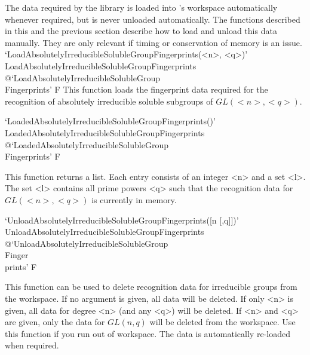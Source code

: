 
The data required by the {\IRREDSOL} library is loaded into {\GAP}'s workspace automatically whenever required, but is never unloaded automatically. The functions described in this
and the previous section describe how to load and unload this data manually. 
They are only relevant if timing or conservation of memory is an issue.
\>`LoadAbsolutelyIrreducibleSolubleGroupFingerprints(<n>, <q>)'%
{LoadAbsolutelyIrreducibleSolubleGroupFingerprints}%
@{`LoadAbsolutelyIrreducibleSolubleGroup\\Fingerprints'} F
This function loads the fingerprint data required for the recognition
of absolutely irreducible soluble subgroups of $GL(<n>, <q>)$.

\>`LoadedAbsolutelyIrreducibleSolubleGroupFingerprints()'%
{LoadedAbsolutelyIrreducibleSolubleGroupFingerprints}%
@{`LoadedAbsolutelyIrreducibleSolubleGroup\\Fingerprints'} F

This function returns a list. Each entry consists of an integer <n> and a set <l>. The set
<l> contains all prime powers <q> such that the recognition data for $GL(<n>, <q>)$ is currently in
memory.

\>`UnloadAbsolutelyIrreducibleSolubleGroupFingerprints([n [,q]])'%
{UnloadAbsolutelyIrreducibleSolubleGroupFingerprints}%
@{`UnloadAbsolutelyIrreducibleSolubleGroup\\Finger\\prints'} F

This function can be used to delete recognition data for irreducible groups from the {\GAP} workspace. If no
argument is given, all data will be deleted. If only <n> is given, all data for degree <n> (and any
<q>) will be deleted. If <n> and <q> are given, only the data for $GL(n, q)$ will be deleted from the
{\GAP} workspace. Use this function if you run out of {\GAP} workspace. The
data is automatically re-loaded when required.


